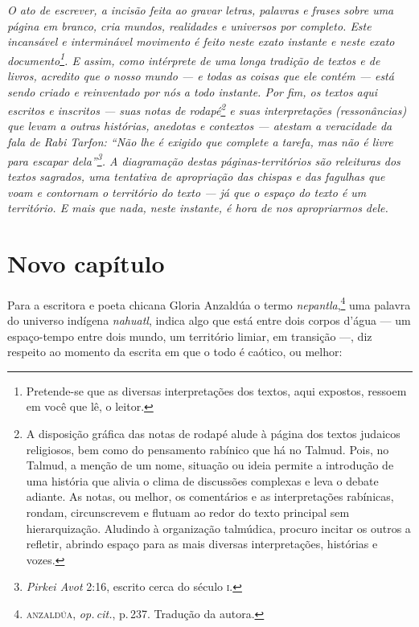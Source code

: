 \pagebreak

{
\thispagestyle{empty}

\mbox{}

\vspace{4cm}

\footnotesize
\noindent{}\emph{\noindent{}O ato de escrever, a incisão feita ao gravar letras, palavras e frases sobre uma página em branco, cria mundos, realidades e universos por completo. Este incansável e interminável movimento é feito neste exato instante e neste exato documento\footnote{Pretende-se que as diversas interpretações dos textos, aqui expostos, ressoem em você que lê, o leitor.}. E assim, como intérprete de uma longa tradição de textos e de livros, acredito que o nosso mundo --- e todas as coisas que ele contém --- está sendo criado e reinventado por nós a todo instante. Por fim, os textos aqui escritos e inscritos --- suas notas de rodapé\footnote{A disposição gráfica das notas de rodapé alude à página dos textos judaicos religiosos, bem como do pensamento rabínico que há no Talmud. Pois, no Talmud, a menção de um nome, situação ou ideia permite a introdução de uma história que alivia o clima de discussões complexas e leva o debate adiante. As notas, ou melhor, os comentários e as interpretações rabínicas, rondam, circunscrevem e flutuam ao redor do texto principal sem hierarquização. Aludindo à organização talmúdica, procuro incitar os outros a refletir, abrindo espaço para as mais diversas interpretações, histórias e vozes.} e suas interpretações (ressonâncias) que levam a outras histórias, anedotas e contextos --- atestam a veracidade da fala de Rabi Tarfon: ``Não lhe é exigido que complete a tarefa, mas não é livre para escapar dela''\footnote{\emph{Pirkei Avot} 2:16, escrito cerca do século \textsc{i}.}. A diagramação destas páginas-territórios são releituras dos textos sagrados, uma tentativa de apropriação das chispas e das fagulhas que voam e contornam o território do texto --- já que o espaço do texto é um território. E mais que nada, neste instante, é hora de nos apropriarmos dele.
}}

\pagebreak

\chapter{Novo capítulo}

\noindent{}Para a escritora e poeta chicana Gloria Anzaldúa o termo \emph{nepantla},\footnote{\textsc{anzaldúa}, \emph{op.\,cit.}, p.\,237. Tradução da autora.} uma palavra do universo indígena \emph{nahuatl}, indica algo que está entre dois corpos d'água --- um espaço-tempo entre dois mundo, um território limiar, em transição ---, diz respeito ao momento da escrita em que o todo é caótico, ou melhor:

